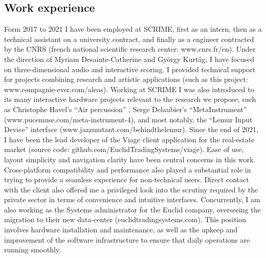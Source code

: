 \documentclass[journal,onecolumn]{IEEEtran}
\begin{document}
\subsection{Work experience} %
Form 2017 to 2021 I have been employed at SCRIME, first as an intern, then as a technical assistant on a university contract, and finally as a engineer contracted by the CNRS (french national scientific research center: www.cnrs.fr/en). Under the direction of Myriam Desainte-Catherine and György Kurtág, I have focused on three-dimensional audio and interactive scoring. I provided technical support for projects combining research and artistic applications (such as this project: www.compagnie-ever.com/aleas). Working at SCRIME I was also introduced to its many interactive hardware projects relevant to the research we propose, such as Christophe Havel's ``Air percussion'' \cite{havel:air}, Serge Delaubier's ``MetaInstrument'' (www.pucemuse.com/meta-instrument-4), and most notably, the ``Lemur Input Device'' interface (www.jazzmutant.com/behindthelemur).
Since the end of 2021, I have been the lead developer of the Viage client application for the real-estate market (source code: github.com/EuclidTradingSystems/viage). Ease of use, layout simplicity and navigation clarity have been central concerns in this work. Cross-platform compatibility and performance also played a substantial role in trying to provide a seamless experience for non-technical users. Direct contact with the client also offered me a privileged look into the scrutiny required by the private sector in terms of convenience and intuitive interfaces. Concurrently, I am also working as the Systems administrator for the Euclid company, overseeing the migration to their new data-center (euclidtradingsystems.com). This position involves hardware installation and maintenance, as well as the upkeep and improvement of the software infrastructure to ensure that daily operations are running smoothly. 
\end{document}
